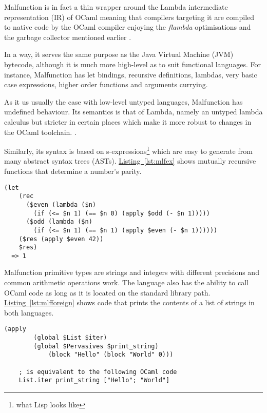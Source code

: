 Malfunction is in fact a thin wrapper around the Lambda intermediate
representation (IR) of OCaml meaning that compilers targeting it
are compiled to native code by the OCaml compiler enjoying the
\emph{flambda} optimisations and the garbage collector mentioned
earlier \citep{dolan2016malfunctional}.

In a way, it serves the same purpose as the Java Virtual Machine (JVM)
bytecode, although it is much more high-level as
to suit functional languages. For instance, Malfunction has
let bindings, recursive definitions, lambdas, very basic case
expressions, higher order functions and arguments currying.

As it us usually the case with low-level untyped languages, Malfunction
has undefined behaviour.
Its semantics is that of Lambda, namely an untyped lambda calculus but
stricter in certain places which make it more robust to changes in the
OCaml toolchain.
\citep{dolan2016malfunctional}.

Similarly, its syntax is based on s-expressions\footnote{
    what Lisp looks like
} which are easy to generate from many abstract syntax trees (ASTs).
\hyperref[lst:mlfex]{Listing~\ref{lst:mlfex}} shows mutually recursive
functions that determine a number's parity.

\begin{lstlisting}[label={lst:mlfex}, caption=
    Mutually recursive functions in Malfunction
    ]
    (let
    (rec
      ($even (lambda ($n) 
        (if (<= $n 1) (== $n 0) (apply $odd (- $n 1)))))
      ($odd (lambda ($n) 
        (if (<= $n 1) (== $n 1) (apply $even (- $n 1))))))
    ($res (apply $even 42))
    $res)
  => 1
\end{lstlisting}

Malfunction primitive types are strings and integers with
different precisions and common arithmetic operations
work. The language also has the ability to call OCaml code as long
as it is located on the standard library path.
\hyperref[lst:mlfforeign]{Listing~\ref{lst:mlfforeign}}
shows code that prints the contents of a list of strings in both
languages.

\begin{lstlisting}[label={lst:mlfforeign}, caption=
    Calling OCaml code from Malfunction]
    (apply
        (global $List $iter)
        (global $Pervasives $print_string)
            (block "Hello" (block "World" 0)))

    ; is equivalent to the following OCaml code
    List.iter print_string ["Hello"; "World"]
\end{lstlisting}
% 

